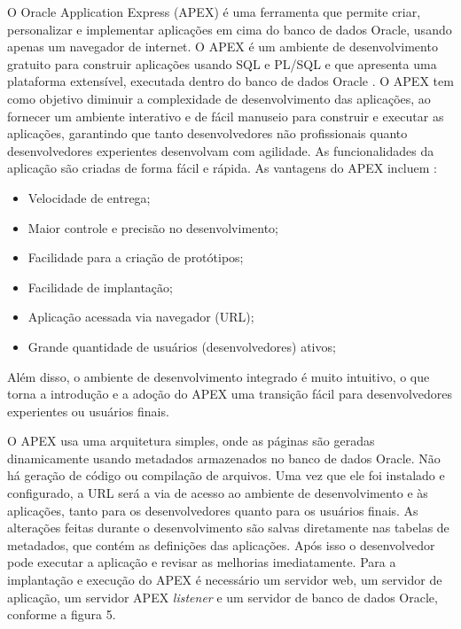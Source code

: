 O Oracle Application Express (APEX) é uma ferramenta que permite criar, personalizar e implementar aplicações em cima do banco de dados Oracle, usando apenas um navegador de internet. O APEX é um ambiente de desenvolvimento gratuito para construir aplicações usando SQL e PL/SQL e que apresenta uma plataforma extensível, executada dentro do banco de dados Oracle \cite{oracleApex}. O APEX tem como objetivo diminuir a complexidade de desenvolvimento das aplicações, ao fornecer um ambiente interativo e de fácil manuseio para construir e executar as aplicações, garantindo que tanto desenvolvedores não profissionais quanto desenvolvedores experientes desenvolvam com agilidade. As funcionalidades da aplicação são criadas de forma fácil e rápida. As vantagens do APEX incluem \cite{oracleApex}:
\begin{itemize}
	\item Velocidade de entrega;
	\item Maior controle e precisão no desenvolvimento;
	\item Facilidade para a criação de protótipos;
	\item Facilidade de implantação;
	\item Aplicação acessada via navegador (URL);
	\item Grande quantidade de usuários (desenvolvedores) ativos;
\end{itemize}

Além disso, o ambiente de desenvolvimento integrado é muito intuitivo, o que torna a introdução e a adoção do APEX uma transição fácil para desenvolvedores experientes ou usuários finais.

O APEX usa uma arquitetura simples, onde as páginas são geradas dinamicamente usando metadados armazenados no banco de dados Oracle. Não há geração de código ou compilação de arquivos. Uma vez que ele foi instalado e configurado, a URL será a via de acesso ao ambiente de desenvolvimento e às aplicações, tanto para os desenvolvedores quanto para os usuários finais. As alterações feitas durante o desenvolvimento são salvas diretamente nas tabelas de metadados, que contém as definições das aplicações. Após isso o desenvolvedor pode executar a aplicação e revisar as melhorias imediatamente.
Para a implantação e execução do APEX é necessário um servidor web, um servidor de aplicação, um servidor APEX \textit{listener} e um servidor de banco de dados Oracle, conforme a figura 5.
\clearpage

